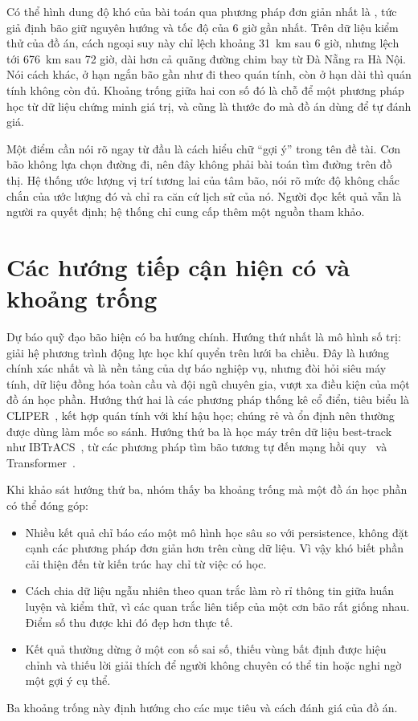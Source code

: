 Có thể hình dung độ khó của bài toán qua phương pháp đơn giản nhất là
, tức giả định bão giữ nguyên hướng và tốc độ của 6 giờ gần
nhất. Trên dữ liệu kiểm thử của đồ án, cách ngoại suy này chỉ lệch khoảng
31~km sau 6 giờ, nhưng lệch tới 676~km sau 72 giờ, dài hơn cả quãng đường
chim bay từ Đà Nẵng ra Hà Nội. Nói cách khác, ở hạn ngắn bão gần như đi theo
quán tính, còn ở hạn dài thì quán tính không còn đủ. Khoảng trống giữa hai con
số đó là chỗ để một phương pháp học từ dữ liệu chứng minh giá trị, và cũng là
thước đo mà đồ án dùng để tự đánh giá.

Một điểm cần nói rõ ngay từ đầu là cách hiểu chữ ``gợi ý'' trong tên đề tài.
Cơn bão không lựa chọn đường đi, nên đây không phải bài toán tìm đường trên đồ
thị. Hệ thống ước lượng vị trí tương lai của tâm bão, nói rõ mức độ không chắc
chắn của ước lượng đó và chỉ ra căn cứ lịch sử của nó. Người đọc kết quả vẫn
là người ra quyết định; hệ thống chỉ cung cấp thêm một nguồn tham khảo.

\section{Các hướng tiếp cận hiện có và khoảng trống}

Dự báo quỹ đạo bão hiện có ba hướng chính. Hướng thứ nhất là mô hình số trị:
giải hệ phương trình động lực học khí quyển trên lưới ba chiều. Đây là hướng
chính xác nhất và là nền tảng của dự báo nghiệp vụ, nhưng đòi hỏi siêu máy
tính, dữ liệu đồng hóa toàn cầu và đội ngũ chuyên gia, vượt xa điều kiện của
một đồ án học phần. Hướng thứ hai là các phương pháp thống kê cổ điển, tiêu
biểu là CLIPER~\cite{Neumann1972}, kết hợp quán tính với khí hậu học; chúng rẻ
và ổn định nên thường được dùng làm mốc so sánh. Hướng thứ ba là học máy trên
dữ liệu best-track như IBTrACS~\cite{Knapp2010}, từ các phương pháp tìm bão
tương tự đến mạng hồi quy~\cite{Hochreiter1997} và
Transformer~\cite{Vaswani2017}.

Khi khảo sát hướng thứ ba, nhóm thấy ba khoảng trống mà một đồ án học phần có
thể đóng góp:
\begin{itemize}[leftmargin=1.6em, itemsep=2pt]
  \item Nhiều kết quả chỉ báo cáo một mô hình học sâu so với persistence, không
        đặt cạnh các phương pháp đơn giản hơn trên cùng dữ liệu. Vì vậy khó biết
        phần cải thiện đến từ kiến trúc hay chỉ từ việc có học.
  \item Cách chia dữ liệu ngẫu nhiên theo quan trắc làm rò rỉ thông tin giữa
        huấn luyện và kiểm thử, vì các quan trắc liên tiếp của một cơn bão rất
        giống nhau. Điểm số thu được khi đó đẹp hơn thực tế.
  \item Kết quả thường dừng ở một con số sai số, thiếu vùng bất định được hiệu
        chỉnh và thiếu lời giải thích để người không chuyên có thể tin hoặc nghi
        ngờ một gợi ý cụ thể.
\end{itemize}
Ba khoảng trống này định hướng cho các mục tiêu và cách đánh giá của đồ án.

